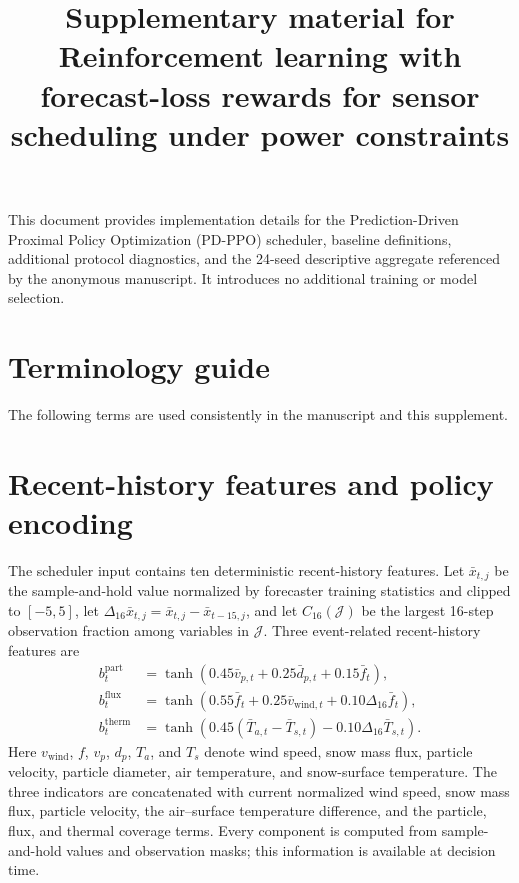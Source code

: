 \documentclass[preprint,12pt]{elsarticle}
\begin{document}
\begin{frontmatter}
\title{Supplementary material for\\
Reinforcement learning with forecast-loss rewards for sensor scheduling under power constraints}
\end{frontmatter}

This document provides implementation details for the Prediction-Driven
Proximal Policy Optimization (PD-PPO) scheduler, baseline definitions,
additional protocol diagnostics, and the 24-seed descriptive aggregate
referenced by the anonymous manuscript. It introduces no additional training
or model selection.

\section*{Terminology guide}

The following terms are used consistently in the manuscript and this
supplement.



\section{Recent-history features and policy encoding}

The scheduler input contains ten deterministic recent-history features. Let
\(\bar{x}_{t,j}\) be the sample-and-hold value normalized by
forecaster training statistics and clipped to \([-5,5]\), let
\(\Delta_{16}\bar{x}_{t,j}=\bar{x}_{t,j}-\bar{x}_{t-15,j}\), and let
\(C_{16}(\mathcal{J})\) be the largest 16-step observation fraction among
variables in \(\mathcal{J}\). Three event-related recent-history features are
\begin{align}
 b_t^{\mathrm{part}} &=
 \tanh(0.45\bar v_{p,t}+0.25\bar d_{p,t}+0.15\bar f_t),\\
 b_t^{\mathrm{flux}} &=
 \tanh(0.55\bar f_t+0.25\bar v_{\mathrm{wind},t}+0.10\Delta_{16}\bar f_t),\\
 b_t^{\mathrm{therm}} &=
 \tanh\!\left(0.45(\bar T_{a,t}-\bar T_{s,t})
 -0.10\Delta_{16}\bar T_{s,t}\right).
\end{align}
Here \(v_{\mathrm{wind}}\), \(f\), \(v_p\), \(d_p\), \(T_a\), and \(T_s\) denote wind
speed, snow mass flux, particle velocity, particle diameter, air temperature,
and snow-surface temperature. The three indicators are concatenated with current
normalized wind speed, snow mass flux, particle velocity, the air--surface
temperature difference, and the particle, flux, and thermal coverage terms.
Every component is computed from sample-and-hold values and observation masks;
this information is available at decision time.
\end{document}
